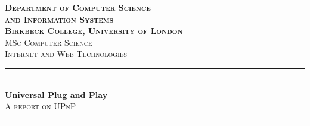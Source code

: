 \begin{titlepage}

\newcommand{\HRule}{\rule{\linewidth}{0.5mm}} %

\center %
 
 

\textbf{\textsc{\Large Department of Computer Science\\[0.2cm]
and Information Systems
\\[0.4cm]Birkbeck College, University of London}}\\[0.8cm] %
\textsc{\large MSc Computer Science}\\[0.8cm] %
\textsc{\large Internet and Web Technologies}\\[0.5cm] %


\HRule \\[0.4cm]
{ \huge \bfseries Universal Plug and Play}\\[0.1cm] %

\textsc{\large A report on UPnP}
\HRule \\[1cm]
 



\end{titlepage}
